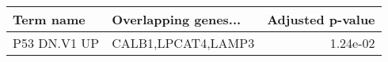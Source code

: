 \begin{tabular}{llr}
\toprule
   Term name & Overlapping genes... &  Adjusted p-value \\
\midrule
P53 DN.V1 UP &   CALB1,LPCAT4,LAMP3 &          1.24e-02 \\
\bottomrule
\end{tabular}
